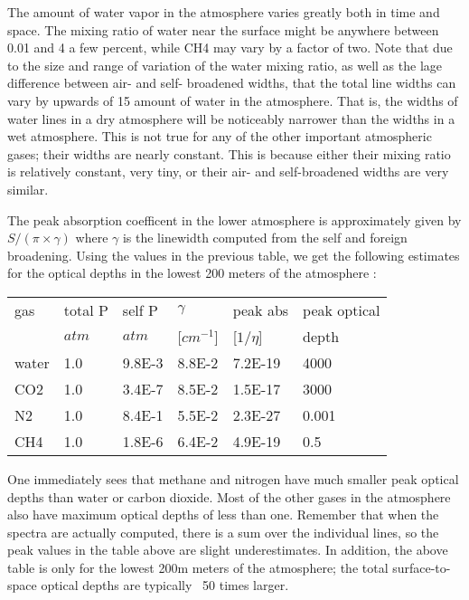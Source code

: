 \documentclass[11pt]{article}
\begin{document}
The amount of water vapor in the atmosphere varies greatly both in
time and space.  The mixing ratio of water near the surface might be
anywhere between 0.01 and 4%
a few percent, while CH4 may vary by a factor of two.  Note that due
to the size and range of variation of the water mixing ratio, as well
as the lage difference between air- and self- broadened widths, that
the total line widths can vary by upwards of 15%
amount of water in the atmosphere.  That is, the widths of water
lines in a dry atmosphere will be noticeably narrower than the widths
in a wet atmosphere.  This is not true for any of the other important
atmospheric gases; their widths are nearly constant.  This is because
either their mixing ratio is relatively constant, very tiny, or their
air- and self-broadened widths are very similar.

The peak absorption coefficent in the lower atmosphere is approximately
given by $S/(\pi \times \gamma)$ 
where $\gamma$ is the linewidth computed from the self and foreign 
broadening.  Using the values in the previous table, we get the following
estimates for the optical depths in the lowest 200 meters of the atmosphere : 

\begin{longtable}{llllll} 
\hline
\hline
gas & total P & self P & $\gamma$   & peak abs   & peak optical \\
    & $atm$   & $atm$  & [$cm^{-1}$] & [$1/\eta$] & depth \\
\hline
\hline
water & 1.0 & 9.8E-3 & 8.8E-2 & 7.2E-19 & 4000 \\
CO2   & 1.0 & 3.4E-7 & 8.5E-2 & 1.5E-17 & 3000 \\
N2    & 1.0 & 8.4E-1 & 5.5E-2 & 2.3E-27 & 0.001\\
CH4   & 1.0 & 1.8E-6 & 6.4E-2 & 4.9E-19 & 0.5\\
\hline
\hline 
\end{longtable} 

One immediately sees that methane and nitrogen have much smaller peak
optical depths than water or carbon dioxide.  Most of the other gases
in the atmosphere also have maximum optical depths of less than one.
Remember that when the spectra are actually computed, there is a sum over 
the individual lines, so the peak values in the table above are slight 
underestimates. In addition, the above table is only for the lowest 200m
meters of the atmosphere; the total surface-to-space optical depths
are typically ~50 times larger.
\end{document}
